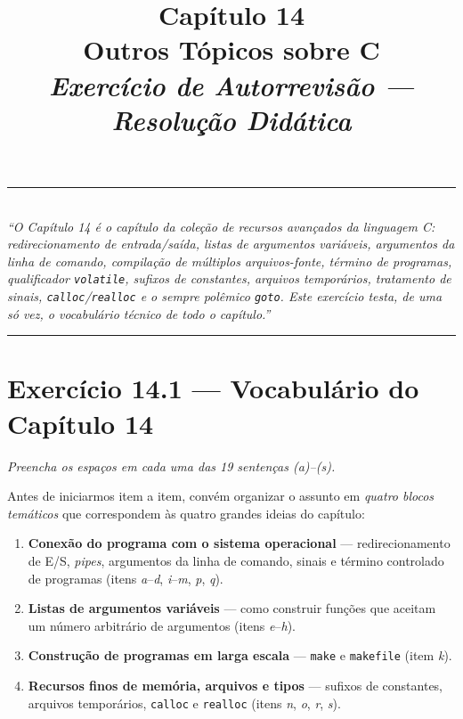 \documentclass[11pt,a4paper]{article}
\title{
  \vspace{-1cm}
  {\Huge\bfseries\color{deitelblue} Cap\'itulo 14}\\[0.3em]
  {\Large\bfseries Outros T\'opicos sobre C}\\[0.8em]
  {\large\itshape Exerc\'icio de Autorrevis\~ao --- Resolu\c{c}\~ao Did\'atica}
}
\author{}
\date{}
\begin{document}
\maketitle
\thispagestyle{empty}
\vspace{-2em}

\begin{center}
\rule{0.85\textwidth}{0.5pt}\\[0.4em]
\textit{``O Cap\'itulo 14 \'e o cap\'itulo da \emph{cole\c{c}\~ao de recursos avan\c{c}ados} da linguagem C: redirecionamento de entrada/sa\'ida, listas de argumentos vari\'aveis, argumentos da linha de comando, compila\c{c}\~ao de m\'ultiplos arquivos-fonte, t\'ermino de programas, qualificador \texttt{volatile}, sufixos de constantes, arquivos tempor\'arios, tratamento de sinais, \texttt{calloc}/\texttt{realloc} e o sempre pol\^emico \texttt{goto}. Este exerc\'icio testa, de uma s\'o vez, o vocabul\'ario t\'ecnico de todo o cap\'itulo.''}\\[0.4em]
\rule{0.85\textwidth}{0.5pt}
\end{center}

\vspace{1em}

\section{Exerc\'icio 14.1 --- Vocabul\'ario do Cap\'itulo 14}

\textit{Preencha os espa\c{c}os em cada uma das 19 senten\c{c}as (a)--(s).}

\medskip

Antes de iniciarmos item a item, conv\'em organizar o assunto em \emph{quatro blocos tem\'aticos} que correspondem \`as quatro grandes ideias do cap\'itulo:

\begin{enumerate}[label=\textbf{Bloco \arabic*:}, leftmargin=*, itemsep=2pt]
  \item \textbf{Conex\~ao do programa com o sistema operacional} --- redirecionamento de E/S, \emph{pipes}, argumentos da linha de comando, sinais e t\'ermino controlado de programas (itens \emph{a}--\emph{d}, \emph{i}--\emph{m}, \emph{p}, \emph{q}).
  \item \textbf{Listas de argumentos vari\'aveis} --- como construir fun\c{c}\~oes que aceitam um n\'umero arbitr\'ario de argumentos (itens \emph{e}--\emph{h}).
  \item \textbf{Constru\c{c}\~ao de programas em larga escala} --- \texttt{make} e \texttt{makefile} (item \emph{k}).
  \item \textbf{Recursos finos de mem\'oria, arquivos e tipos} --- sufixos de constantes, arquivos tempor\'arios, \texttt{calloc} e \texttt{realloc} (itens \emph{n}, \emph{o}, \emph{r}, \emph{s}).
\end{enumerate}
\end{document}
